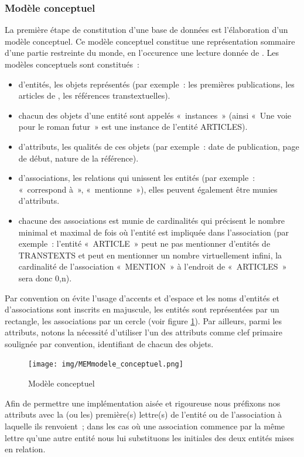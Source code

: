 \documentclass[12pt, a4paper]{article}
\begin{document}
\subsubsection{Modèle conceptuel}
\label{ref:db_modele_conceptuel}
 La première étape de constitution d'une base de données est l'élaboration d'un modèle conceptuel. Ce modèle conceptuel constitue une représentation sommaire d'une partie restreinte du monde, en l'occurence une lecture donnée de \punr%
 . Les modèles conceptuels sont constitués~: 
    \begin{itemize}
        \item d'entités, les objets représentés (par exemple~: les premières publications, les articles de \punr{}, les références transtextuelles).
        \item chacun des objets d'une entité sont appelés «~instances~» (ainsi «~Une voie pour le roman futur~» est une instance de l'entité ARTICLES).
        \item d'attributs, les qualités de ces objets (par exemple~: date de publication, page de début, nature de la référence).
        \item d'associations, les relations qui unissent les entités (par exemple~: «~correspond à~», «~mentionne~»), elles peuvent également être munies d'attributs.
        \item chacune des associations est munie de cardinalités qui précisent le nombre minimal et maximal de fois où l’entité est impliquée dans l’association (par exemple~: l'entité «~ARTICLE~» peut ne pas mentionner d'entités de TRANSTEXTS et peut en mentionner un nombre virtuellement infini, la cardinalité de l'association «~MENTION~» à l'endroit de «~ARTICLES~» sera donc 0,n).
    \end{itemize}
    Par convention on évite l'usage d'accents et d'espace et les noms d'entités et d'associations sont inscrits en majuscule, les entités sont représentées par un rectangle, les associations par un cercle (voir figure \ref{concept}). Par ailleurs, parmi les attributs, notons la nécessité d'utiliser l'un des attributs comme clef primaire soulignée par convention, identifiant de chacun des objets.


\begin{figure}[H]
    \centering
    \texttt{[image: img/MEMmodele\_conceptuel.png]}
    \caption{Modèle conceptuel}
    \label{concept}
\end{figure}
Afin de permettre une implémentation aisée et rigoureuse nous préfixons nos attributs avec la (ou les) première(s) lettre(s) de l'entité ou de l'association à laquelle ils renvoient~; dans les cas où une association commence par la même lettre qu'une autre entité nous lui substituons les initiales des deux entités mises en relation.
\end{document}
